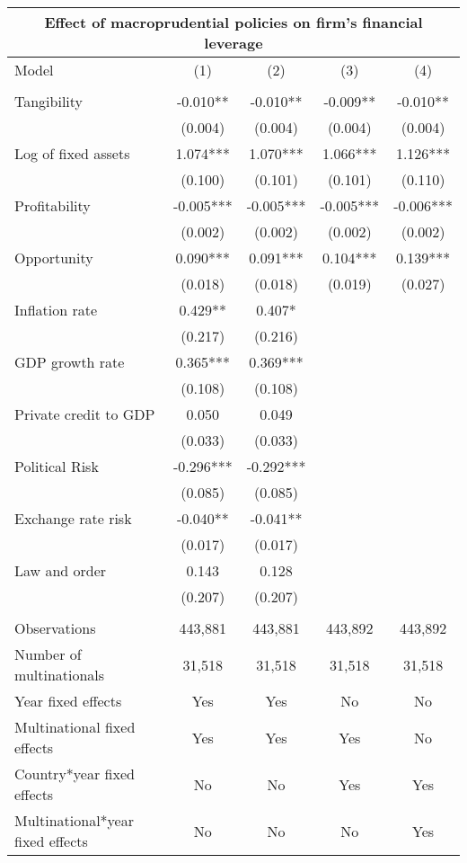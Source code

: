 \begin{tabular}{lcccc}
\multicolumn{5}{c}{Effect of macroprudential policies on firm's financial leverage} \\ \hline
Model  & (1) & (2) & (3) & (4) \\ \hline
 &  &  &  &  \\
Tangibility & -0.010** & -0.010** & -0.009** & -0.010** \\
 & (0.004) & (0.004) & (0.004) & (0.004) \\
Log of fixed assets & 1.074*** & 1.070*** & 1.066*** & 1.126*** \\
 & (0.100) & (0.101) & (0.101) & (0.110) \\
Profitability & -0.005*** & -0.005*** & -0.005*** & -0.006*** \\
 & (0.002) & (0.002) & (0.002) & (0.002) \\
Opportunity & 0.090*** & 0.091*** & 0.104*** & 0.139*** \\
 & (0.018) & (0.018) & (0.019) & (0.027) \\
Inflation rate & 0.429** & 0.407* &  &  \\
 & (0.217) & (0.216) &  &  \\
GDP growth rate & 0.365*** & 0.369*** &  &  \\
 & (0.108) & (0.108) &  &  \\
Private credit to GDP & 0.050 & 0.049 &  &  \\
 & (0.033) & (0.033) &  &  \\
Political Risk & -0.296*** & -0.292*** &  &  \\
 & (0.085) & (0.085) &  &  \\
Exchange rate risk & -0.040** & -0.041** &  &  \\
 & (0.017) & (0.017) &  &  \\
Law and order & 0.143 & 0.128 &  &  \\
 & (0.207) & (0.207) &  &  \\
 &  &  &  &  \\
Observations & 443,881 & 443,881 & 443,892 & 443,892 \\
Number of multinationals & 31,518 & 31,518 & 31,518 & 31,518 \\
Year fixed effects & Yes & Yes & No & No \\
Multinational fixed effects & Yes & Yes & Yes & No \\
Country*year fixed effects & No & No & Yes & Yes \\
 Multinational*year fixed effects & No & No & No & Yes \\ \hline
\end{tabular}
